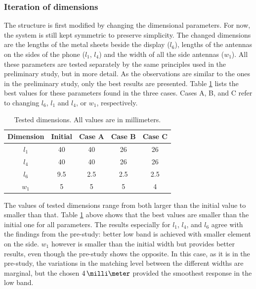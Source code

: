 \subsubsection{Iteration of dimensions}
\label{sec:dimension iteration}
The structure is first modified by changing the dimensional parameters. For now, the system is still kept symmetric to preserve simplicity. The changed dimensions are the lengths of the metal sheets beside the display ($l_6$), lengths of the antennas on the sides of the phone ($l_1$, $l_4$) and the width of all the side antennas ($w_1$). All these parameters are tested separately by the same principles used in the preliminary study, but in more detail. As the observations are similar to the ones in the preliminary study, only the best results are presented. Table \ref{tab:concept2} lists the best values for these parameters found in the three cases. Cases A, B, and C refer to changing $l_6$, $l_1$ and $l_4$, or $w_1$, respectively. 
\begin{table}[H]
    \centering
    \caption{Tested dimensions. All values are in millimeters.}
    \label{tab:concept2}
    \begin{tabular}{|c|c|c|c|c|}
        \hline
        \textbf{Dimension} & \textbf{Initial} & \textbf{Case A} & \textbf{Case B} & \textbf{Case C}\\
        \hline
        $l_1$ & 40 & 40 & 26 & 26\\
        \hline
        $l_4$ & 40 & 40 & 26 & 26\\
        \hline
        $l_6$ & 9.5 & 2.5 & 2.5 & 2.5\\
        \hline
        $w_1$ & 5 & 5 & 5 & 4\\
        \hline
    \end{tabular}
\end{table}

The values of tested dimensions range from both larger than the initial value to smaller than that. Table \ref{tab:concept2} above shows that the best values are smaller than the initial one for all parameters. The results especially for $l_1$, $l_4$, and $l_6$ agree with the findings from the pre-study: better low band is achieved with smaller element on the side. $w_1$ however is smaller than the initial width but provides better results, even though the pre-study shows the opposite. In this case, as it is in the pre-study, the variations in the matching level between the different widths are marginal, but the chosen $4\,\milli\meter$ provided the smoothest response in the low band.

